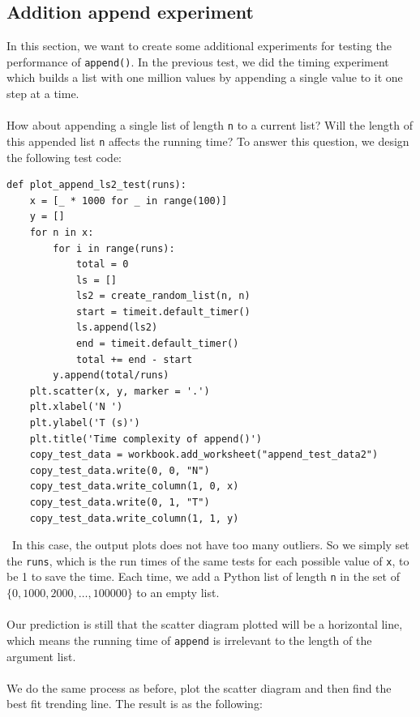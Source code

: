 \documentclass[12pt]{article}
\begin{document}
\subsection{Addition append experiment}
In this section, we want to create some additional experiments for testing the performance of \verb|append()|. In the previous test, we did the timing experiment which builds a list with one million values by appending a single value to it one step at a time.\\\\
How about appending a single list of length \verb|n| to a current list? Will the length of this appended list \verb|n| affects the running time? To answer this question, we design the following test code:
\lstset{language=Python, basicstyle=\ttfamily\small, breaklines=true, showspaces=false,
  showstringspaces=false, breakatwhitespace=true}
\begin{lstlisting}
def plot_append_ls2_test(runs):
    x = [_ * 1000 for _ in range(100)]
    y = []
    for n in x:
        for i in range(runs):
            total = 0
            ls = []
            ls2 = create_random_list(n, n)
            start = timeit.default_timer()
            ls.append(ls2)
            end = timeit.default_timer()
            total += end - start
        y.append(total/runs)
    plt.scatter(x, y, marker = '.')
    plt.xlabel('N ')
    plt.ylabel('T (s)')
    plt.title('Time complexity of append()')
    copy_test_data = workbook.add_worksheet("append_test_data2")
    copy_test_data.write(0, 0, "N")
    copy_test_data.write_column(1, 0, x)
    copy_test_data.write(0, 1, "T")
    copy_test_data.write_column(1, 1, y)
\end{lstlisting}

~\newline\noindent In this case, the output plots does not have too many outliers. So we simply set the \verb|runs|, which is the run times of the same tests for each possible value of \verb|x|, to be 1 to save the time. Each time, we add a Python list of length \verb|n| in the set of $\{0, 1000, 2000, \dots, 100000\}$ to an empty list.\\\\
Our prediction is still that the scatter diagram plotted will be a horizontal line, which means the running time of \verb|append| is irrelevant to the length of the argument list.\\\\
We do the same process as before, plot the scatter diagram and then find the best fit trending line. The result is as the following:
\end{document}

